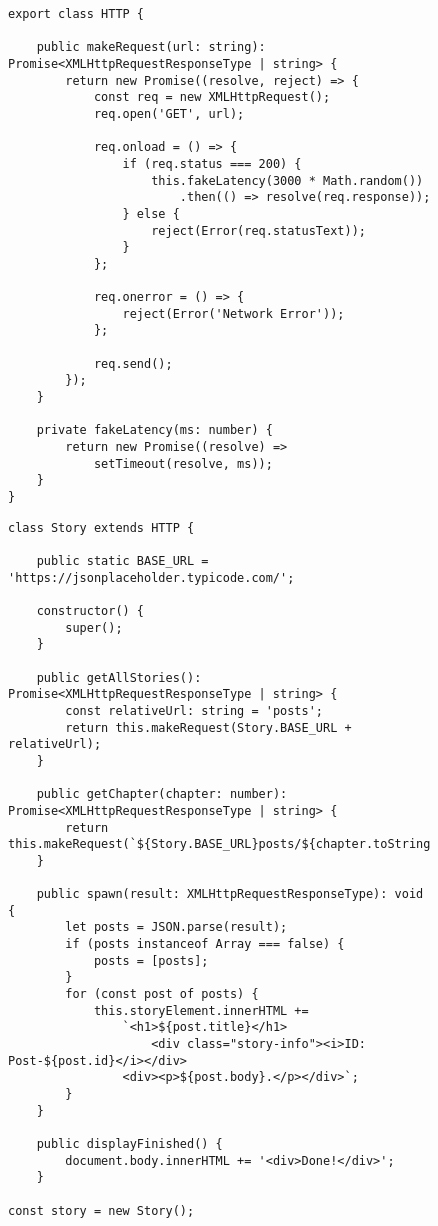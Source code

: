 \begin{figure}[H]
\begin{lstlisting}
export class HTTP {

    public makeRequest(url: string): Promise<XMLHttpRequestResponseType | string> {
        return new Promise((resolve, reject) => {
            const req = new XMLHttpRequest();
            req.open('GET', url);

            req.onload = () => {
                if (req.status === 200) {
                    this.fakeLatency(3000 * Math.random())
                        .then(() => resolve(req.response));
                } else {
                    reject(Error(req.statusText));
                }
            };

            req.onerror = () => {
                reject(Error('Network Error'));
            };

            req.send();
        });
    }

    private fakeLatency(ms: number) {
        return new Promise((resolve) =>
            setTimeout(resolve, ms));
    }
}
\end{lstlisting}
\end{figure}

\begin{figure}[H]
\begin{lstlisting}
class Story extends HTTP {

    public static BASE_URL = 'https://jsonplaceholder.typicode.com/';

    constructor() {
        super();
    }

    public getAllStories(): Promise<XMLHttpRequestResponseType | string> {
        const relativeUrl: string = 'posts';
        return this.makeRequest(Story.BASE_URL + relativeUrl);
    }

    public getChapter(chapter: number): Promise<XMLHttpRequestResponseType | string> {
        return this.makeRequest(`${Story.BASE_URL}posts/${chapter.toString()}`);
    }

    public spawn(result: XMLHttpRequestResponseType): void {
        let posts = JSON.parse(result);
        if (posts instanceof Array === false) {
            posts = [posts];
        }
        for (const post of posts) {
            this.storyElement.innerHTML +=
                `<h1>${post.title}</h1>
                    <div class="story-info"><i>ID: Post-${post.id}</i></div>
                <div><p>${post.body}.</p></div>`;
        }
    }

    public displayFinished() {
        document.body.innerHTML += '<div>Done!</div>';
    }

const story = new Story();
\end{lstlisting}
\end{figure}

